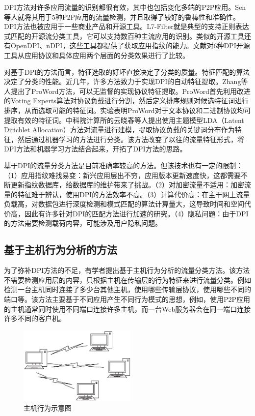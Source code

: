 DPI方法对许多应用流量的识别都很有效，其中也包括变化多端的P2P应用。Sen等人就将其用于5种P2P应用的流量检测，并且取得了较好的鲁棒性和准确性\supercite{sen2004accurate}。DPI方法也被应用于一些商业产品和开源工具。L7-Filter\supercite{l7filter}就是典型的支持正则表达式匹配的开源流分类工具，它可以支持数百种主流应用的识别。类似的开源工具还有OpenDPI、nDPI，这些工具都提供了获取应用指纹的能力。文献\cite{bujlow2015independent}对6种DPI开源工具从应用协议和具体应用两个层面的分类效果进行了比较。

对基于DPI的方法而言，特征选取的好坏直接决定了分类的质量。特征匹配的算法决定了分类的性能。近几年，许多方法致力于实现DPI的自动特征提取。Zhang等人提出了ProWord方法\supercite{zhang2014proword}，可以无监督的实现协议特征提取。ProWord首先利用改进的Voting Experts算法对协议负载进行分割，然后定义排序规则对候选特征词进行排序，从而选取可能的特征词。实验表明ProWord对于文本协议和二进制协议均可提取有效的特征词。中科院计算所的云晓春等人\supercite{yun2016semantics}提出使用主题模型LDA（Latent Dirichlet Allocation）方法对流量进行建模，提取协议负载的关键词分布作为特征，然后通过机器学习的方法进行分类。该方法改变了以往的流量特征形式，将DPI方法和机器学习方法结合起来，开拓了DPI方法的思路。

基于DPI的流量分类方法是目前准确率较高的方法。但该技术也有一定的限制：（1）应用指纹难找易变：新兴应用层出不穷，应用版本更新速度快，这都需要不断更新指纹数据库，给数据库的维护带来了挑战。（2）对加密流量不适用：加密流量的特征难于辨认，使用DPI的方法效率不高。（3）计算代价高：在主干网上流量负载高，对数据包进行深度检测和模式匹配的算法计算量大，这导致时间和空间代价高，因此有许多针对DPI的匹配方法进行加速的研究\supercite{ikeuchi2013gpu,vasiliadis2014gaspp}。（4）隐私问题：由于DPI的方法需要检测载荷内容，可能涉及用户隐私问题。

\subsection{基于主机行为分析的方法}
为了弥补DPI方法的不足，有学者提出基于主机行为分析的流量分类方法。该方法不需要检测应用层的内容，只根据主机在传输层的行为特征来进行流量分类。例如检测一台主机同时连接了多少台其他主机，使用哪些传输层协议，使用哪些不同的端口等。该方法主要基于不同应用产生不同行为模式的思想，例如，使用P2P应用的主机通常同时使用不同端口连接许多主机，而一台Web服务器会在同一端口连接许多不同的客户机。

\begin{figure}[thb]
\centering
\includegraphics[height=1.5in]{./figures/2/2-1}
\caption{主机行为示意图}
\label{fig:21}
\end{figure}

